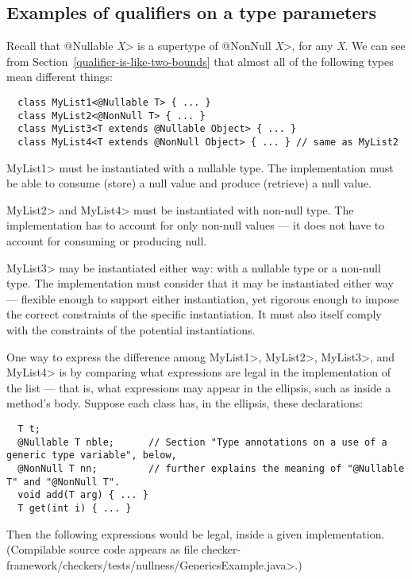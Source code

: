 \subsection{Examples of qualifiers on a type parameters}

Recall that \<@Nullable \emph{X}> is a supertype of \<@NonNull \emph{X}>,
for any \emph{X}\@.
We can see from Section~\ref{qualifier-is-like-two-bounds} that almost all
of the following types mean
different things:

\begin{Verbatim}
  class MyList1<@Nullable T> { ... }
  class MyList2<@NonNull T> { ... }
  class MyList3<T extends @Nullable Object> { ... }
  class MyList4<T extends @NonNull Object> { ... } // same as MyList2
\end{Verbatim}

\<MyList1> must be instantiated with a nullable type. 
The implementation must be able to consume (store) a null
value and produce (retrieve) a null value.

\<MyList2> and \<MyList4> must be instantiated with non-null type.
The implementation has to account for only non-null values --- it
does not have to account for consuming or producing null.

\<MyList3> may be instantiated either way:
with a nullable type or a non-null type.  The implementation must consider
that it may be instantiated either way --- flexible enough to support either
instantiation, yet rigorous enough to impose the correct constraints of the
specific instantiation.  It must also itself comply with the constraints of
the potential instantiations.

One way to express the difference
among \<MyList1>, \<MyList2>, \<MyList3>, and \<MyList4>
is by comparing what expressions are
legal in the implementation of the list --- that is, what expressions may
appear in the ellipsis, such as inside a method's body.  Suppose each class
has, in the ellipsis, these declarations:

\begin{Verbatim}
  T t;
  @Nullable T nble;      // Section "Type annotations on a use of a generic type variable", below,
  @NonNull T nn;         // further explains the meaning of "@Nullable T" and "@NonNull T".
  void add(T arg) { ... }
  T get(int i) { ... }
\end{Verbatim}

\noindent
Then the following expressions would be legal, inside a given implementation.
(Compilable source code appears as file
\<checker-framework/checkers/tests/nullness/GenericsExample.java>.)

